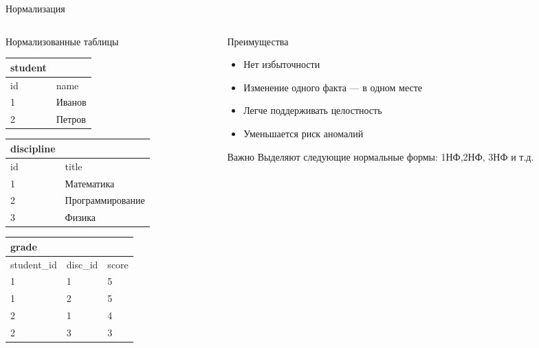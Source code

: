 \documentclass[aspectratio=169]{beamer}
\begin{document}
\begin{frame}{Нормализация}
\vspace{-0.5cm} 
\begin{columns}[T]
\begin{column}{0.48\textwidth}
\begin{block}{Нормализованные таблицы}
\small
\begin{tabular}{|l|l|}
\hline
\textbf{student} & \\
\hline
id & name \\
1 & Иванов \\
2 & Петров \\
\hline
\end{tabular}

\vspace{0.1cm}

\begin{tabular}{|l|l|}
\hline
\textbf{discipline} & \\
\hline
id & title \\
1 & Математика \\
2 & Программирование \\
3 & Физика \\
\hline
\end{tabular}

\vspace{0.1cm}

\begin{tabular}{|l|l|l|}
\hline
\textbf{grade} & & \\
\hline
student\_id & disc\_id & score \\
1 & 1 & 5 \\
1 & 2 & 5 \\
2 & 1 & 4 \\
2 & 3 & 3 \\
\hline
\end{tabular}
\end{block}
\end{column}

\begin{column}{0.48\textwidth}
\begin{exampleblock}{Преимущества}
\begin{itemize}
  \item Нет избыточности
  \item Изменение одного факта — в одном месте
  \item Легче поддерживать целостность
  \item Уменьшается риск аномалий
\end{itemize}
\end{exampleblock}

\vspace{0.4cm}

\begin{alertblock}{Важно}
Выделяют следующие нормальные формы: 1НФ,2НФ, 3НФ и т.д.
\end{alertblock}
\end{column}
\end{columns}

\end{frame}
\end{document}
